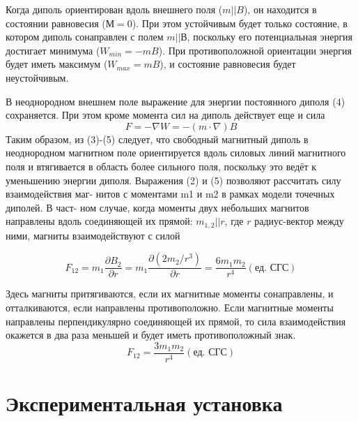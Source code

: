 \documentclass[12pt,a4paper]{article}
\begin{document}
Когда диполь ориентирован вдоль внешнего поля ($m || B$), он находится в состоянии равновесия ($М= 0$). При этом устойчивым будет только состояние, в котором диполь 
сонаправлен с полем $m || В$, поскольку его потенциальная энергия достигает минимума ($W_{min} = -mB$). При противоположной ориентации энергия будет иметь максимум 
($W_{max} = mB$), и состояние равновесия будет неустойчивым.

    В неоднородном внешнем поле выражение для энергии постоянного диполя (4) сохраняется. При этом кроме момента сил на диполь действует еще и сила 
\begin{equation}
    F = - \nabla W = - (m \cdot \nabla)B
\end{equation}
\label{sila}
Таким образом, из (3)-(5) следует, что свободный магнитный диполь в неоднородном магнитном поле ориентируется вдоль силовых линий магнитного поля и втягивается в область более сильного поля, поскольку это ведёт к уменьшению энергии диполя.
Выражения (2) и (5) позволяют рассчитать силу взаимодействия маг- нитов с моментами m1 и m2 в рамках модели точечных диполей. В част- ном случае, когда моменты двух небольших магнитов направлены вдоль
соединяющей их прямой: $m_{1,2} || r$, где $r$ радиус-вектор между ними, магниты взаимодействуют с силой

\begin{equation}
    F_{12} = m_1 \frac{\partial B_2}{\partial r} = m_1 \frac{\partial(2m_2/r^3)}{\partial r} = \frac{6m_1 m_2}{r^4} (\text{ед. СГС})
\end{equation}
\label{six}

Здесь магниты притягиваются, если их магнитные моменты сонаправлены, и отталкиваются, если направлены противоположно.
    Если магнитные моменты направлены перпендикулярно соединяющей их прямой, то сила взаимодействия окажется в два раза меньшей и будет иметь противоположный знак.
\[
F_{12} = \frac{3m_1 m_2}{r^4} (\text{ед. СГС})
\]

\section{Экспериментальная установка}
\end{document}
